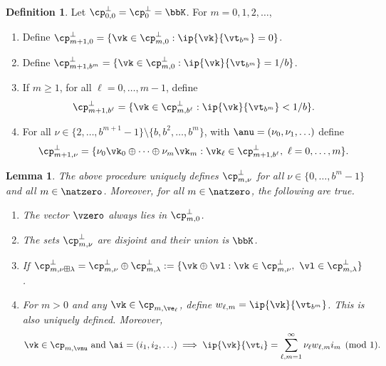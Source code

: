 \documentclass[]{elsarticle}
\newtheorem{lem}{Lemma}
\theoremstyle{definition}
\newtheorem{defin}{Definition}
\begin{document}
\begin{defin} \label{noodefalgo} Let $\cp_{0,0}^{\perp}=\cp_{0}^{\perp}=\bbK$.  For $m=0, 1, 2, \ldots$, 
\begin{enumerate}
\renewcommand{\labelenumi}{\alph{enumi})}
\item Define $\cp_{m+1,0}^{\perp}=\{\vk \in \cp_{m,0}^{\perp} : \ip{\vk}{\vt_{b^{m}}}=0\}$.
\item Define $\cp_{m+1,b^{m}}^{\perp}=\{\vk \in \cp_{m,0}^{\perp} : \ip{\vk}{\vt_{b^{m}}}=1/b\}$.  
\item If $m\ge 1$, for all $\ell=0, \ldots, m-1$, define 
\[
\cp_{m+1,b^{\ell}}^{\perp}=\{\vk \in \cp_{m,b^{\ell}}^{\perp} : \ip{\vk}{\vt_{b^{m}}}<1/b\}.
\]
\item For all $\nu \in \{2, \ldots, b^{m+1}-1\} \setminus \{b, b^2, \ldots, b^m\}$, with $\anu=(\nu_0, \nu_1, \ldots)$ define 
\[
\cp_{m+1,\nu}^{\perp}= \{\nu_0\vk_0 \oplus \cdots \oplus \nu_{m} \vk_{m}  : \vk_\ell \in \cp_{m+1,b^{\ell}}^{\perp},\  \ell=0, \ldots, m\}.
\]
\end{enumerate}
\end{defin}

\begin{lem} \label{cosetlem} The above procedure uniquely defines $\cp_{m,\nu}^{\perp}$  for all $\nu \in \{0, \ldots, b^m-1\}$ and all $m \in \natzero$.  Moreover, for all $m \in \natzero$, the following are true.
\begin{enumerate}
\renewcommand{\labelenumi}{\alph{enumi})}

\item The vector $\vzero$ always lies in $\cp_{m,0}^{\perp}$.

\item The sets $\cp_{m,\nu}^{\perp}$ are disjoint and their union is $\bbK$.

\item If $\cp_{m,\nu \boxplus \lambda}^{\perp} = \cp_{m,\nu}^{\perp} \oplus \cp_{m,\lambda}^{\perp} := \{\vk \oplus \vl :  \vk \in \cp_{m,\nu}^{\perp},\ \vl \in \cp_{m,\lambda}^{\perp}\}$.

\item For $m>0$ and any $\vk \in \cp_{m,\ve_\ell}$, define $w_{\ell,m}=\ip{\vk}{\vt_{b^m}}$.  This is also uniquely defined.  Moreover,
\begin{equation} \label{nuwisum}
\vk\in \cp_{m,\vnu} \text{ and } \ai=(i_1, i_2, \ldots) \implies{} \ip{\vk}{\vt_i} = \sum_{\ell,m=1}^{\infty} \nu_\ell w_{\ell,m} i_m \pmod 1.
\end{equation}

\end{enumerate}
\end{lem}
\end{document}
